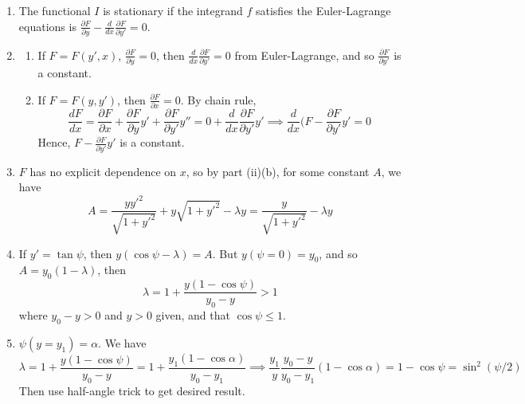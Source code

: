 \documentclass[a4paper]{article}
\begin{document}
\begin{ans}\leavevmode
\begin{enumerate}[label=(\roman*)]
\item The functional $I$ is stationary if the integrand $f$ satisfies the Euler-Lagrange equations is $\frac{\partial F}{\partial y}-\frac{d}{dx}\frac{\partial F}{\partial y'}=0$.
\item 
\begin{enumerate}[label=(\alph*)]
\item If $F=F(y',x)$, $\frac{\partial F}{\partial y}=0$, then $\frac{d}{dx}\frac{\partial F}{\partial y'}=0$ from Euler-Lagrange, and so $\frac{\partial F}{\partial y'}$ is a constant.
\item If $F=F(y,y')$, then $\frac{\partial F}{\partial x}=0$. By chain rule, 
$$\frac{dF}{dx}=\frac{\partial F}{\partial x}+\frac{\partial F}{\partial y}y'+\frac{\partial F}{\partial y'}y''=0+\frac{d}{dx}\frac{\partial F}{\partial y'}y'\implies\frac{d}{dx}\bigg(F-\frac{\partial F}{\partial y'}y'=0$$
Hence, $F-\frac{\partial F}{\partial y'}y'$ is a constant.
\end{enumerate}
\item $F$ has no explicit dependence on $x$, so by part (ii)(b), for some constant $A$, we have
$$A=\frac{yy'^2}{\sqrt{1+y'^2}}+y\sqrt{1+y'^2}-\lambda y=\frac{y}{\sqrt{1+y'^2}}-\lambda y$$
\item If $y'=\tan\psi$, then $y(\cos\psi-\lambda)=A$. But $y(\psi=0)=y_0$, and so $A=y_0(1-\lambda)$, then 
$$\lambda=1+\frac{y(1-\cos\psi)}{y_0-y}>1$$
where $y_0-y>0$ and $y>0$ given, and that $\cos\psi\leq 1$.
\item $\psi(y=y_1)=\alpha$. We have
$$\lambda=1+\frac{y(1-\cos\psi)}{y_0-y}=1+\frac{y_1(1-\cos\alpha)}{y_0-y_1}\implies \frac{y_1}{y}\frac{y_0-y}{y_0-y_1}(1-\cos\alpha)=1-\cos\psi=\sin^2(\psi/2)$$
Then use half-angle trick to get desired result.
\end{enumerate}
\end{ans}
\newpage
\end{document}
